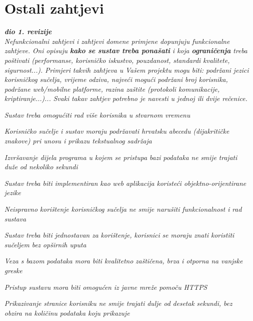 		\section{Ostali zahtjevi}
		
			\textbf{\textit{dio 1. revizije}}\\
		 
			 \textit{Nefunkcionalni zahtjevi i zahtjevi domene primjene dopunjuju funkcionalne zahtjeve. Oni opisuju \textbf{kako se sustav treba ponašati} i koja \textbf{ograničenja} treba poštivati (performanse, korisničko iskustvo, pouzdanost, standardi kvalitete, sigurnost...). Primjeri takvih zahtjeva u Vašem projektu mogu biti: podržani jezici korisničkog sučelja, vrijeme odziva, najveći mogući podržani broj korisnika, podržane web/mobilne platforme, razina zaštite (protokoli komunikacije, kriptiranje...)... Svaki takav zahtjev potrebno je navesti u jednoj ili dvije rečenice.}

			\begin{packed_item}

				\item \textit{Sustav treba omogućiti rad više korisnika u stvarnom vremenu}
				\item \textit{Korisničko sučelje i sustav moraju podržavati hrvatsku abecedu (dijakritičke
				znakove) pri unosu i prikazu tekstualnog sadržaja}
				\item \textit{Izvršavanje dijela programa u kojem se pristupa bazi podataka ne smije trajati
				duže od nekoliko sekundi}
				\item \textit{Sustav treba biti implementiran kao web aplikacija koristeći
				objektno-orijentirane jezike}
				\item \textit{Neispravno korištenje korisničkog sučelja ne smije narušiti funkcionalnost i
				rad sustava}
				\item \textit{Sustav treba biti jednostavan za korištenje, korisnici se moraju znati koristiti
				sučeljem bez opširnih uputa}
				\item \textit{Veza s bazom podataka mora biti kvalitetno zaštičena, brza i otporna na
				vanjske greske}
				\item \textit{Pristup sustavu mora biti omogućen iz javne mreže pomoču HTTPS}
				\item \textit{Prikazivanje stranice korisniku ne smije trajati dulje od desetak sekundi,
				bez obzira na količinu podataka koju prikazuje}

			\end{packed_item}
			 
	